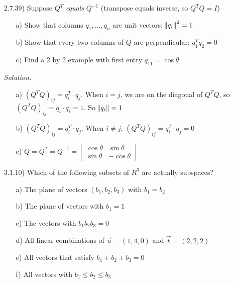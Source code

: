 \documentclass[12pt]{article}
\begin{document}
\begin{itemize}
\item[2.7.39)] Suppose $Q^T$ \textit{equals} $Q^{-1}$ (transpose equals inverse, so $Q^TQ=I$)
\begin{itemize}
\item[a)] Show that columns $q_1,\ldots,q_n$ are unit vectors: $\norm{q_i}^2=1$
\item[b)] Show that every two columns of $Q$ are perpendicular: $q^T_1q_2=0$
\item[c)] Find a 2 by 2 example with first entry $q_{11}= \cos\theta$
\end{itemize}

\textit{Solution.}
\begin{itemize}
\item[a)] $(Q^TQ)_{ij}=q^T_i \cdot q_j$. When $i=j$, we are on the diagonal of $Q^TQ$, so $(Q^TQ)_{ij}=q_i \cdot q_i=1$. So $\norm{q_i}=1$
\item[b)] $(Q^TQ)_{ij}=q^T_i \cdot q_j$. When $i\neq j$, $(Q^TQ)_{ij}=q^T_i \cdot q_j=0$
\item[c)] $Q=Q^T=Q^{-1}=\left[\begin{array}{cc} \cos\theta & \sin\theta \\ \sin\theta & -\cos\theta\end{array}\right]$
\end{itemize}

\item[3.1.10)] Which of the following subsets of $R^3$ are actually subspaces?
\begin{itemize}
\item[a)] The plane of vectors $(b_1,b_2,b_3)$ with $b_1=b_2$
\item[b)] The plane of vectors with $b_1=1$
\item[c)] The vectors with $b_1b_2b_3=0$
\item[d)] All linear combinations of $\vec{u}=(1,4,0)$ and $\vec{t}=(2,2,2)$
\item[e)] All vectors that satisfy $b_1+b_2+b_3=0$
\item[f)] All vectors with $b_1 \leq b_2 \leq b_3$
\end{itemize}


\end{itemize}
\end{document}

